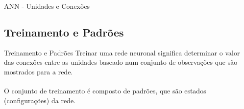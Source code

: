 \begin{frame}{ANN - Unidades e Conexões}%
\end{frame}

\subsection{Treinamento e Padrões}%
\begin{frame}{Treinamento e Padrões}%
  \justifying%
  Treinar uma rede neuronal significa determinar o valor das conexões entre as unidades baseado num conjunto de observações que são mostrados para a rede.
  \\~\\
  O conjunto de treinamento é composto de padrões, que são estados (configurações) da rede.
\end{frame}
